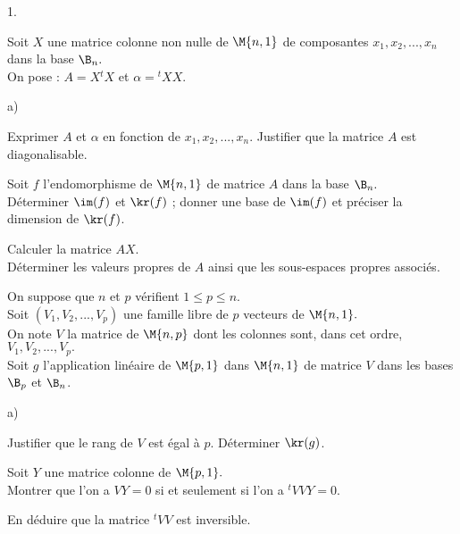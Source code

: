\begin{noliste}{1.}
 \setlength{\itemsep}{4mm}
 \item Soit $X$ une matrice colonne non nulle de 
 $\M{n,1}$ de composantes $x_1,x_2,...,x_n$ dans la base 
 $\B_n.$\\
 On pose : $A=X{}^{t}{}{X}$ et $\alpha = {}^{t}{}{X}X.$
 \begin{noliste}{a)}
  \setlength{\itemsep}{2mm}
  \item Exprimer $A$ et $\alpha$ en fonction de $x_1,x_2,...,x_n$.
  Justifier que la matrice $A$ est diagonalisable.
  
  


  \item Soit $f$ l'endomorphisme de $\M{n,1}$ de matrice $A$ dans la 
  base $\B_n.$\\
  Déterminer $\im(f)$ et $\kr(f)$ ; donner une base de 
  $\im(f)$ et préciser la dimension de $\kr(f)$.
  
  

  
  \item Calculer la matrice $AX$. \\
  Déterminer les valeurs propres de $A$ 
  ainsi que les sous-espaces propres associés.
  
  
 \end{noliste}
 
 
 
 
 
 
 
 
 \item On suppose que $n$ et $p$ vérifient $1 \leq p \leq n$.\\
 Soit $(V_1,V_2,...,V_p)$ une famille libre de $p$ vecteurs de 
 $\M{n,1}.$\\
 On note $V$ la matrice de $\M{n,p}$ dont les colonnes sont, dans cet 
 ordre, $V_1,V_2,...,V_p.$\\
 Soit $g$ l'application linéaire de $\M{p,1}$ dans $\M{n,1}$ de matrice 
 $V$ dans les bases $\B_p$ et $\B_n$.
 \begin{noliste}{a)}
  \setlength{\itemsep}{2mm}
  \item Justifier que le rang de $V$ est égal à $p$. Déterminer 
  $\kr(g)$.
  
  
  
  \item Soit $Y$ une matrice colonne de $\M{p,1}.$\\
  Montrer que l'on a $VY=0$ si et seulement si l'on a ${}^t{}VVY=0$.
  
  
  
  
  
  
  
  
  
  \item En déduire que la matrice ${}^t{}VV$ est inversible.
  
  
 \end{noliste}
\end{noliste}


